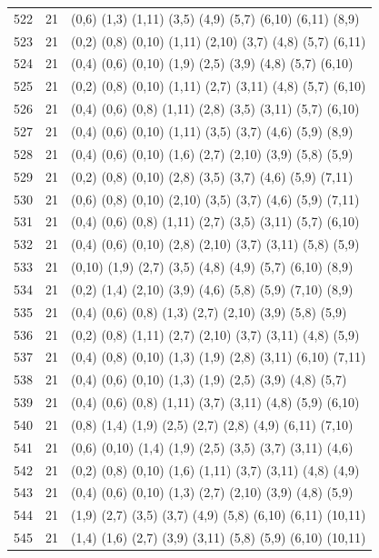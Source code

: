{\begin{longtable}{lll}
522 & 21 & (0,6) (1,3) (1,11) (3,5) (4,9) (5,7) (6,10) (6,11) (8,9) \\
523 & 21 & (0,2) (0,8) (0,10) (1,11) (2,10) (3,7) (4,8) (5,7) (6,11) \\
524 & 21 & (0,4) (0,6) (0,10) (1,9) (2,5) (3,9) (4,8) (5,7) (6,10) \\
525 & 21 & (0,2) (0,8) (0,10) (1,11) (2,7) (3,11) (4,8) (5,7) (6,10) \\
526 & 21 & (0,4) (0,6) (0,8) (1,11) (2,8) (3,5) (3,11) (5,7) (6,10) \\
527 & 21 & (0,4) (0,6) (0,10) (1,11) (3,5) (3,7) (4,6) (5,9) (8,9) \\
528 & 21 & (0,4) (0,6) (0,10) (1,6) (2,7) (2,10) (3,9) (5,8) (5,9) \\
529 & 21 & (0,2) (0,8) (0,10) (2,8) (3,5) (3,7) (4,6) (5,9) (7,11) \\
530 & 21 & (0,6) (0,8) (0,10) (2,10) (3,5) (3,7) (4,6) (5,9) (7,11) \\
531 & 21 & (0,4) (0,6) (0,8) (1,11) (2,7) (3,5) (3,11) (5,7) (6,10) \\
532 & 21 & (0,4) (0,6) (0,10) (2,8) (2,10) (3,7) (3,11) (5,8) (5,9) \\
533 & 21 & (0,10) (1,9) (2,7) (3,5) (4,8) (4,9) (5,7) (6,10) (8,9) \\
534 & 21 & (0,2) (1,4) (2,10) (3,9) (4,6) (5,8) (5,9) (7,10) (8,9) \\
535 & 21 & (0,4) (0,6) (0,8) (1,3) (2,7) (2,10) (3,9) (5,8) (5,9) \\
536 & 21 & (0,2) (0,8) (1,11) (2,7) (2,10) (3,7) (3,11) (4,8) (5,9) \\
537 & 21 & (0,4) (0,8) (0,10) (1,3) (1,9) (2,8) (3,11) (6,10) (7,11) \\
538 & 21 & (0,4) (0,6) (0,10) (1,3) (1,9) (2,5) (3,9) (4,8) (5,7) \\
539 & 21 & (0,4) (0,6) (0,8) (1,11) (3,7) (3,11) (4,8) (5,9) (6,10) \\
540 & 21 & (0,8) (1,4) (1,9) (2,5) (2,7) (2,8) (4,9) (6,11) (7,10) \\
541 & 21 & (0,6) (0,10) (1,4) (1,9) (2,5) (3,5) (3,7) (3,11) (4,6) \\
542 & 21 & (0,2) (0,8) (0,10) (1,6) (1,11) (3,7) (3,11) (4,8) (4,9) \\
543 & 21 & (0,4) (0,6) (0,10) (1,3) (2,7) (2,10) (3,9) (4,8) (5,9) \\
544 & 21 & (1,9) (2,7) (3,5) (3,7) (4,9) (5,8) (6,10) (6,11) (10,11) \\
545 & 21 & (1,4) (1,6) (2,7) (3,9) (3,11) (5,8) (5,9) (6,10) (10,11) \\

\end{longtable}}
